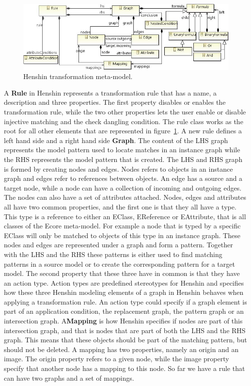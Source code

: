 \begin{figure}[H]
	\centering
	\includegraphics[scale=0.8]{./Figures/Henshin_metamodel.png}
	\caption[Henshin transformation meta-model]
	{Henshin transformation meta-model\cite{Arendt2010}.}
	\label{fig:Henshin_metamodel}
\end{figure}

A \textbf{Rule} in Henshin represents a transformation rule that has a name,
a description and three properties. The first property disables or enables the
transformation rule, while the two other properties lets the user enable or
disable injective matching and the check dangling condition. The rule class
works as the root for all other elements that are represented in 
figure~\ref{fig:Henshin_metamodel}. A new rule defines a left hand side and a
right hand side \textbf{Graph}. The content of the LHS graph represents the
model pattern used to locate matches in an instance graph while the RHS
represents the model pattern that is created. The LHS and RHS graph is formed by
creating nodes and edges. Nodes refers to objects in an instance graph and
edges refer to references between objects. An edge has a source and a target
node, while a node can have a collection of incoming and outgoing edges. The
nodes can also have a set of attributes attached. Nodes, edges and attributes
all have two common properties, and the first one is that they all have a type.
This type is a reference to either an EClass, EReference or EAttribute, that is
all classes of the Ecore meta-model. For example a node that is typed by a
specific EClass will only be matched to objects of this type in an instance
graph. These nodes and edges are represented under a graph and form a pattern.
Together with the LHS and the RHS these patterns is either used to find
matching patterns in a source model or to create the corresponding pattern for
a target model. The second property that these three have in common is that
they have an action type. Action types are predefined stereotypes for Henshin
and specifies how these three Henshin modeling elements of a graph in Henshin
behaves when applying a transformation rule. An action type could specify if a
graph element is part of an application condition, the replacement graph, the
pattern graph or an intersection graph. A\textbf{Mapping} is how
Henshin specifies if nodes are part of this intersection graph, and that is
nodes that are part of both the LHS and the RHS graph. This means that these
objects should be part of the matching pattern, but should not be deleted. A
mapping has two properties, namely an origin and an image. The origin property
refers to a given node, while the image property specify that another node has
a mapping to this node. So far we have a rule that can have two graphs and a
set of mappings. 

